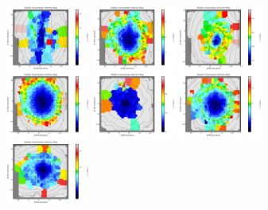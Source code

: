 \begin{figure}
      \centering
      \includegraphics[width=0.245\textwidth]{Vmaps/ngc0612_stellar_vel_uncert.png}
      \includegraphics[width=0.245\textwidth]{Vmaps/ngc3557_stellar_vel_uncert.png}
      \includegraphics[width=0.245\textwidth]{Vmaps/ngc3100_stellar_vel_uncert.png}
      \includegraphics[width=0.245\textwidth]{Vmaps/ic1459_stellar_vel_uncert.png}
      \includegraphics[width=0.245\textwidth]{Vmaps/pks0718-34_stellar_vel_uncert.png}
      \includegraphics[width=0.245\textwidth]{Vmaps/ic4296_stellar_vel_uncert.png}
      \includegraphics[width=0.245\textwidth]{Vmaps/ngc7075_stellar_vel_uncert.png}

\end{figure}
